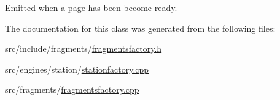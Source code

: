Emitted when a page has been become ready. 



The documentation for this class was generated from the following files\+:\begin{DoxyCompactItemize}
\item 
src/include/fragments/\mbox{\hyperlink{fragmentsfactory_8h}{fragmentsfactory.\+h}}\item 
src/engines/station/\mbox{\hyperlink{stationfactory_8cpp}{stationfactory.\+cpp}}\item 
src/fragments/\mbox{\hyperlink{fragmentsfactory_8cpp}{fragmentsfactory.\+cpp}}\end{DoxyCompactItemize}
